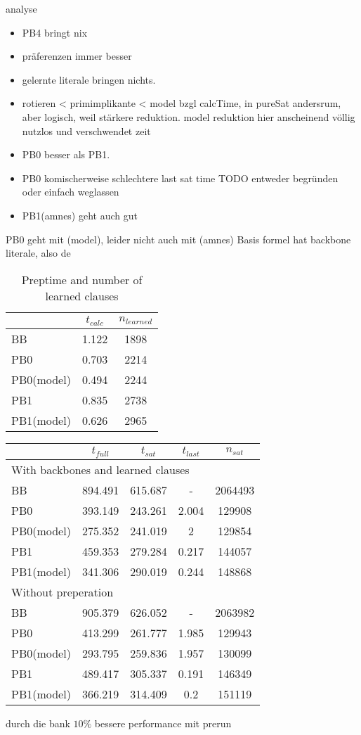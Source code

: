 analyse
\begin{itemize}
\item PB4 bringt nix
\item präferenzen immer besser
\item gelernte literale bringen nichts.
\item rotieren < primimplikante < model bzgl calcTime, in pureSat andersrum, aber logisch, weil stärkere reduktion. model reduktion hier anscheinend völlig nutzlos und verschwendet zeit
\item PB0 besser als PB1. 
\item PB0 komischerweise schlechtere last sat time TODO entweder begründen oder einfach weglassen
\item PB1(amnes) geht auch gut
\end{itemize}
PB0 geht mit (model), leider nicht auch mit (amnes)
Basis formel hat backbone literale, also de


\begin{wraptable}{R}{6cm}
\begin{tabular}{l| c c}
& $t_{calc}$& $n_{learned}$\\
\hline
BB & 1.122 & 1898 \\
PB0 & 0.703 & 2214 \\
PB0(model) & 0.494 & 2244 \\
PB1 & 0.835 & 2738 \\
PB1(model) & 0.626 & 2965 \\
\end{tabular}
\caption{Preptime and number of learned clauses}
\end{wraptable}



\begin{wraptable}{R}{8cm}
\begin{tabular}{l | c c c c}
 & $t_{full}$ & $t_{sat}$ & $t_{last}$& $n_{sat}$\\
\hline
\multicolumn{5}{l}{With backbones and learned clauses}\\
BB & 894.491 & 615.687 & - & 2064493\\
PB0 & 393.149 & 243.261 & 2.004 & 129908\\
PB0(model) & 275.352 & 241.019 & 2 & 129854\\
PB1 & 459.353 & 279.284 & 0.217 & 144057\\
PB1(model) & 341.306 & 290.019 & 0.244 & 148868\\
\hline 
\multicolumn{3}{l}{Without preperation}\\
BB & 905.379 & 626.052 & - & 2063982\\
PB0 & 413.299 & 261.777 & 1.985 & 129943\\
PB0(model) & 293.795 & 259.836 & 1.957 & 130099\\
PB1 & 489.417 & 305.337 & 0.191 & 146349\\
PB1(model) & 366.219 & 314.409 & 0.2 & 151119\\
\hline
\end{tabular}
\end{wraptable}

durch die bank $10\%$ bessere performance mit prerun